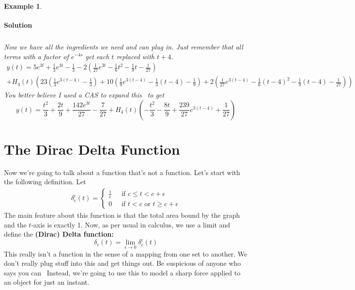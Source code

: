 \documentclass[letterpaper, 11pt, openany]{book}
\theoremstyle{mytheoremstyle}
\theoremstyle{myexamplestyle}
\newtheorem{example}{Example}[section]
\newenvironment{solution}{\paragraph{\sffamily \smaller \fontseries{b}\selectfont Solution}}{\hfill\faSquare}
\begin{document}
\begin{example}
\begin{solution}
\begin{align*}
        \end{align*}
        Now we have all the ingredients we need and can plug in. Just remember that all terms with a factor of \(e^{-4s}\) get each \(t\) replaced with \(t+4\).
        \begin{multline*}
            y(t) = 5e^{3t} + \frac{1}{3}e^{3t} - \frac{1}{3} - 2\left(\frac{1}{27}e^{3t} - \frac{1}{6}t^{2} - \frac{1}{9}t - \frac{1}{27}\right) \\ + H_{4}(t)\left(23\left(\frac{1}{3}e^{3(t-4)} - \frac{1}{3}\right) + 10\left(\frac{1}{9}e^{3(t-4)} - \frac{1}{3}(t-4) - \frac{1}{9}\right)+ 2 \left(\frac{1}{27}e^{3(t-4)} - \frac{1}{6}(t-4)^{2} - \frac{1}{9}(t-4) - \frac{1}{27}\right)\right)
        \end{multline*}
        You better believe I used a CAS to expand this \faLaugh \ to get
        \[y(t) =  \frac{t^2}{3}+\frac{2 t}{9}+\frac{142 e^{3 t}}{27}-\frac{7}{27}+ H_{4}(t)\left(-\frac{t^2}{3}-\frac{8 t}{9}+\frac{239}{27} e^{3 (t-4)}+\frac{1}{27}\right)\]
    \end{solution}
\end{example}
\section{The Dirac Delta Function}
\setcounter{figure}{0}
Now we're going to talk about a function that's not a function. Let's start with the following definition. Let
\begin{align*}
    \delta_{c}^{\epsilon}(t) = \begin{cases}
        \frac{1}{\epsilon} \; &\text{ if } c \leq t < c + \epsilon\\
        0 \; &\text{ if } t < c \text{ or } t \geq c + \epsilon
    \end{cases}
\end{align*}
The main feature about this function is that the total area bound by the graph and the \(t\)-axis is exactly 1. Now, as per usual in calculus, we use a limit and define the \textbf{(Dirac) Delta function: }
\[\delta_{c}(t) = \lim_{\epsilon \to 0} \delta_{c}^{\epsilon}(t)\]
This really isn't a function in the sense of a mapping from one set to another. We don't really plug stuff into this and get things out. Be suspicious of anyone who says you can \faFlushed \ Instead, we're going to use this to model a sharp force applied to an object for just an instant.
\end{document}
